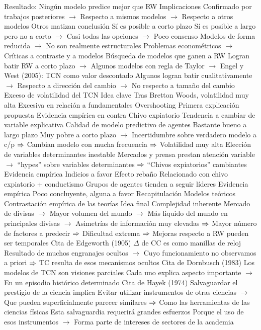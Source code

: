 \documentclass{nuevotema}
\begin{document}
\begin{esquemal}
				\4 Resultado:
				\4[] Ningún modelo predice mejor que RW
			\3 Implicaciones
				\4 Confirmado por trabajos posteriores
				\4[] $\to$ Respecto a mismos modelos
				\4[] $\to$ Respecto a otros modelos
				\4 Otros matizan conclusión
				\4[] Sí es posible a corto plazo
				\4[] Sí es posible a largo pero no a corto
				\4[] $\to$ Casi todas las opciones
				\4[] $\to$ Poco consenso
				\4 Modelos de forma reducida
				\4[] $\to$ No son realmente estructurales
				\4 Problemas econométricos
				\4[] $\to$ Críticas a contraste y a modelos
				\4 Búsqueda de modelos que ganen a RW
				\4[] Logran batir RW a corto plazo
				\4[] $\to$ Algunos modelos con regla de Taylor
				\4[] $\to$ Engel y West (2005): TCN como valor descontado
				\4[] Algunos logran batir cualitativamente
				\4[] $\to$ Respecto a dirección del cambio
				\4[] $\to$ No respecto a tamaño del cambio
		\2 Exceso de volatilidad del TCN
			\3 Idea clave
				\4 Tras Bretton Woods, volatilidad muy alta
				\4 Excesiva en relación a fundamentales
			\3 Overshooting
				\4 Primera explicación propuesta
				\4 Evidencia empírica en contra
			\3 Chivo expiatorio
				\4 Tendencia a cambiar de variable explicativa
				\4 Calidad de modelo predictivo de agentes
				\4[] Bastante bueno a largo plazo
				\4[] Muy pobre a corto plazo
				\4[] $\to$ Incertidumbre sobre verdadero modelo a c/p
				\4[] $\Rightarrow$ Cambian modelo con mucha frecuencia
				\4[] $\Rightarrow$ Volatilidad muy alta
				\4 Elección de variables determinantes inestable
				\4[] Mercados y prensa prestan atención variable
				\4[] $\to$ ``hypes'' sobre variables determinantes
				\4[] $\Rightarrow$ ``Chivos expiatorios'' cambiantes
				\4 Evidencia empírica
				\4[] Indicios a favor
			\3 Efecto rebaño
				\4 Relacionado con chivo expiatorio + conductismo
				\4 Grupos de agentes tienden a seguir líderes
				\4 Evidencia empírica
				\4[] Poco concluyente, alguna a favor
	\1[] 
		\2 Recapitulación
			\3 Modelos teóricos
			\3 Contrastación empírica de las teorías
		\2 Idea final
			\3 Complejidad inherente
				\4 Mercado de divisas
				\4[] $\to$ Mayor volumen del mundo
				\4[] $\to$ Más liquido del mundo en principales divisas
				\4[] $\to$ Asimetrías de información muy elevadas
				\4[] $\Rightarrow$ Mayor número de factores a predecir
				\4[] $\Rightarrow$ Dificultad extrema
				\4[] $\Rightarrow$ Mejoras respecto a RW pueden ser temporales
			\3 Cita de Edgeworth (1905)
				\4 $\Delta$ de CC es como manillas de reloj
				\4[] Resultado de muchos engranajes ocultos
				\4[] $\to$ Cuyo funcionamiento no observamos a priori
				\4[] $\Rightarrow$ TC resulta de esos mecanismos ocultos
			\3 Cita de Dornbusch (1983)
				\4 Los modelos de TCN son visiones parciales
				\4[] Cada uno explica aspecto importante
				\4[] $\to$ En un episodio histórico determinado
			\3 Cita de Hayek (1974)
				\4 Salvaguardar el prestigio de la ciencia implica
				\4[] Evitar utilizar instrumentos de otras ciencias
				\4[] $\to$ Que pueden superficialmente parecer similares
				\4[] $\Rightarrow$ Como las herramientas de las ciencias físicas
				\4 Esta salvaguardia requerirá grandes esfuerzos
				\4[] Porque el uso de esos instrumentos
				\4[] $\to$ Forma parte de intereses de sectores de la academia
\end{esquemal}
\end{document}

